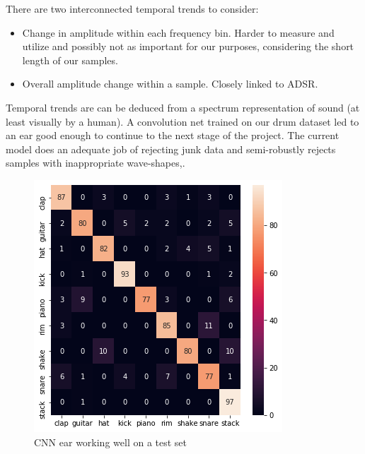 \documentclass{article}
\begin{document}
There are two interconnected temporal trends to consider: 
\begin{itemize}
    \item Change in amplitude within each frequency bin. Harder to measure and utilize and possibly not as important for our purposes, considering the short length of our samples.
    \item Overall amplitude change within a sample. Closely linked to ADSR. 
\end{itemize}{}

Temporal trends are can be deduced from a spectrum representation of sound (at least visually by a human). A convolution net trained on our drum dataset led to an ear good enough to continue to the next stage of the project. The current model does an adequate job of rejecting junk data and semi-robustly rejects samples with inappropriate wave-shapes,.
\begin{figure}[H]
\centering
\includegraphics[width=0.8\linewidth]{images/cnn_ear.png}
\caption{CNN ear working well on a test set}
\label{fig:ok ear}
\end{figure}
\end{document}
